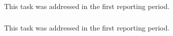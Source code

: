 \subparagraph{}
\label{dksbases@data-design}
This task was addressed in the first reporting period.

\subparagraph{}
\label{dksbases@data-foundationCAS}
This task was addressed in the first reporting period.
%
%
\medskip

\subparagraph{}
\label{dksbases@data-research-categories}

